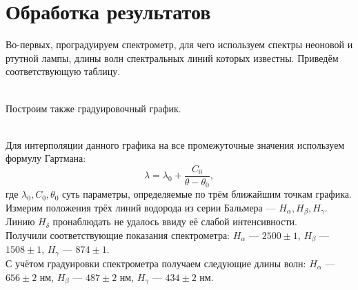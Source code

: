 \documentclass[a4paper, 12pt]{article}
\begin{document}
\section*{Обработка результатов}
Во-первых, проградуируем спектрометр, для чего используем спектры неоновой и ртутной лампы, длины волн спектральных линий которых известны. Приведём соответствующую таблицу.\\
\begin{figure}[h!]
\end{figure}\\
Построим также градуировочный график.\\
\begin{figure}[h!]
\end{figure}\\
Для интерполяции данного графика на все промежуточные значения используем формулу Гартмана:
\begin{equation}
\lambda=\lambda_0+\dfrac{C_0}{\theta-\theta_0},
\end{equation}
где $\lambda_0, C_0,\theta_0$ суть параметры, определяемые по трём ближайшим точкам графика.\\
Измерим положения трёх линий водорода из серии Бальмера --- $H_{\alpha}, H_{\beta}, H_{\gamma}$. Линию $H_{\delta}$ пронаблюдать не удалось ввиду её слабой интенсивности.\\
Получили соответствующие показания спектрометра: $H_{\alpha}$ --- $2500\pm 1$, $H_{\beta}$ --- $1508 \pm 1$, $H_{\gamma}$ --- $874 \pm 1$.\\
С учётом градуировки спектрометра получаем следующие длины волн: $H_{\alpha}$ --- $656 \pm 2$ нм, $H_{\beta}$ --- $487 \pm 2$ нм, $H_{\gamma}$ --- $434 \pm 2$ нм.\\
\end{document}
